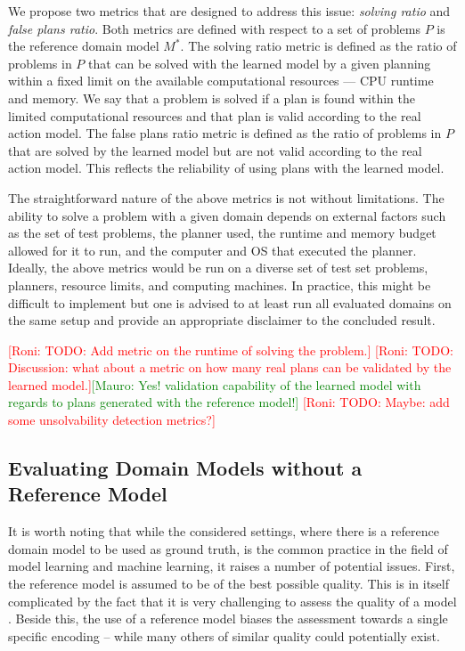 \documentclass{article}
\theoremstyle{definition}
\theoremstyle{remark}
\newcommand{\realm}{\ensuremath{M^*}\xspace}
\newcommand{\roni}[1]{{\textcolor{red}{[Roni: #1]}}}
\newcommand{\mauro}[1]{{\textcolor{green}{[Mauro: #1]}}}
\begin{document}
We propose two metrics that are designed to address this issue: \emph{solving ratio} and \emph{false plans ratio}. 
Both metrics are defined with respect to a set of problems $P$ is the reference domain model $\realm$. 
The solving ratio metric is defined as the ratio of problems in $P$ that can be solved with the learned model by a given planning within a fixed limit on the available computational resources --- CPU runtime and memory. 
We say that a problem is solved if a plan is found within the limited computational resources and that plan is valid according to the real action model. 
The false plans ratio metric is defined as the ratio of problems in $P$ that are solved by the learned model but are not valid according to the real action model. This reflects the reliability of using plans with the learned model.

The straightforward nature of the above metrics is not without limitations. The ability to solve a problem with a given domain depends on external factors such as the set of test problems, the planner used, the runtime and memory budget allowed for it to run, and the computer and OS that executed the planner. Ideally, the above metrics would be run on a diverse set of test set problems, planners, resource limits, and computing machines. In practice, this might be difficult to implement but one is advised to at least run all evaluated domains on the same setup and provide an appropriate disclaimer to the concluded result. 

\roni{TODO: Add metric on the runtime of solving the problem.}
\roni{TODO: Discussion: what about a metric on how many real plans can be validated by the learned model.}\mauro{Yes! validation capability of the learned model with regards to plans generated with the reference model!}
\roni{TODO: Maybe: add some unsolvability detection metrics?}




\subsection{Evaluating Domain Models without a Reference Model}
It is worth noting that while the considered settings, where there is a reference domain model to be used as ground truth, is the common practice in the field of model learning and machine learning, it raises a number of potential issues. First, the reference model is assumed to be of the best possible quality. This is in itself complicated by the fact that it is very challenging to assess the quality of a model \cite{DBLP:conf/kcap/McCluskeyVV17}. Beside this, the use of a reference model biases the assessment towards a single specific encoding -- while many others of similar quality could potentially exist.  
\end{document}
